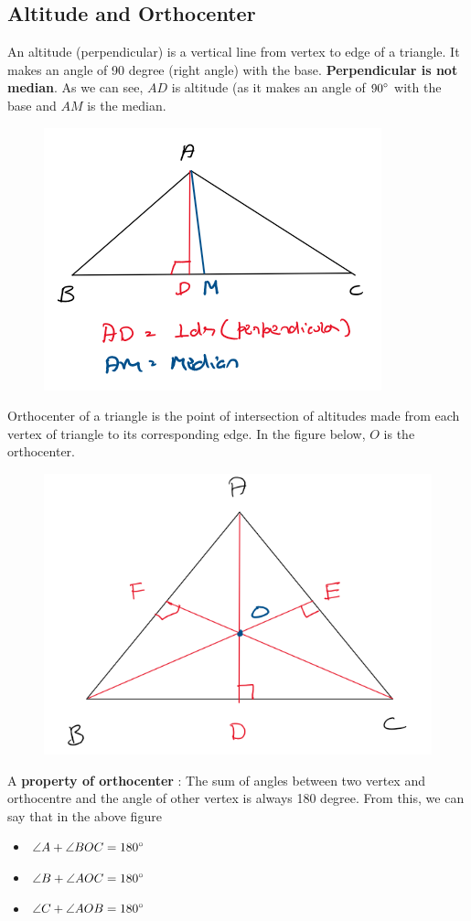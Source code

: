 \subsection{Altitude and Orthocenter}
An altitude (perpendicular) is a vertical line from vertex to edge of a triangle. It makes an angle of 90 degree (right angle) with the base. \textbf{Perpendicular is not median}. As we can see, $AD$ is altitude (as it makes an angle of ${90}^{\circ}$ with the base and $AM$ is the median. 

\begin{figure}[h!]
    \centering
    \includegraphics[width=0.5\linewidth]{Quant//Geometry//Images//Triangles/altitude.png}
\end{figure}

Orthocenter of a triangle is the point of intersection of altitudes made from each vertex of triangle to its corresponding edge. In the figure below, $O$ is the orthocenter. 

\begin{figure}[h!]
    \centering
    \includegraphics[width=0.5\linewidth]{Quant//Geometry//Images//Triangles/orthocenter.png}
\end{figure}

A \textbf{property of orthocenter} : The sum of angles between two vertex and orthocentre and the angle of other vertex is always 180 degree. From this, we can say that in the above figure
\begin{itemize}
    \item $\angle A + \angle BOC = {180}^{\circ}$
    \item $\angle B + \angle AOC = {180}^{\circ}$
    \item $\angle C + \angle AOB = {180}^{\circ}$
\end{itemize}

